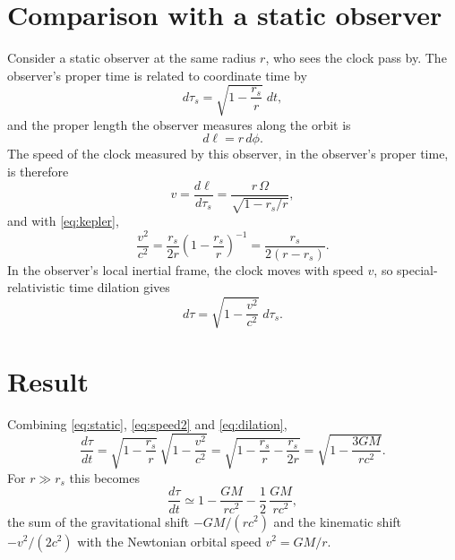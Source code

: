\documentclass{article}
\begin{document}
\section{Comparison with a static observer}
Consider a static observer at the same radius $r$, who sees the clock pass by. The observer's proper time is related to coordinate time by
\begin{equation}
  d\tau_s = \sqrt{1 - \frac{r_s}{r}}\;dt ,
  \label{eq:static}
\end{equation}
and the proper length the observer measures along the orbit is
\begin{equation}
  d\ell = r\,d\phi .
  \label{eq:length}
\end{equation}
The speed of the clock measured by this observer, in the observer's proper time, is therefore
\begin{equation}
  v = \frac{d\ell}{d\tau_s} = \frac{r\,\Omega}{\sqrt{1 - r_s/r}} ,
  \label{eq:speed}
\end{equation}
and with \eqref{eq:kepler},
\begin{equation}
  \frac{v^2}{c^2} = \frac{r_s}{2r}\left(1 - \frac{r_s}{r}\right)^{-1} = \frac{r_s}{2(r - r_s)} .
  \label{eq:speed2}
\end{equation}
In the observer's local inertial frame, the clock moves with speed $v$, so special-relativistic time dilation gives
\begin{equation}
  d\tau = \sqrt{1 - \frac{v^2}{c^2}}\;d\tau_s .
  \label{eq:dilation}
\end{equation}

\section{Result}
Combining \eqref{eq:static}, \eqref{eq:speed2} and \eqref{eq:dilation},
\begin{equation}
  \frac{d\tau}{dt} = \sqrt{1 - \frac{r_s}{r}}\,\sqrt{1 - \frac{v^2}{c^2}} = \sqrt{1 - \frac{r_s}{r} - \frac{r_s}{2r}} = \sqrt{1 - \frac{3GM}{rc^2}} .
  \label{eq:result}
\end{equation}
For $r \gg r_s$ this becomes
\begin{equation}
  \frac{d\tau}{dt} \simeq 1 - \frac{GM}{rc^2} - \frac{1}{2}\,\frac{GM}{rc^2} ,
  \label{eq:weak}
\end{equation}
the sum of the gravitational shift $-GM/(rc^2)$ and the kinematic shift $-v^2/(2c^2)$ with the Newtonian orbital speed $v^2 = GM/r$.
\end{document}
